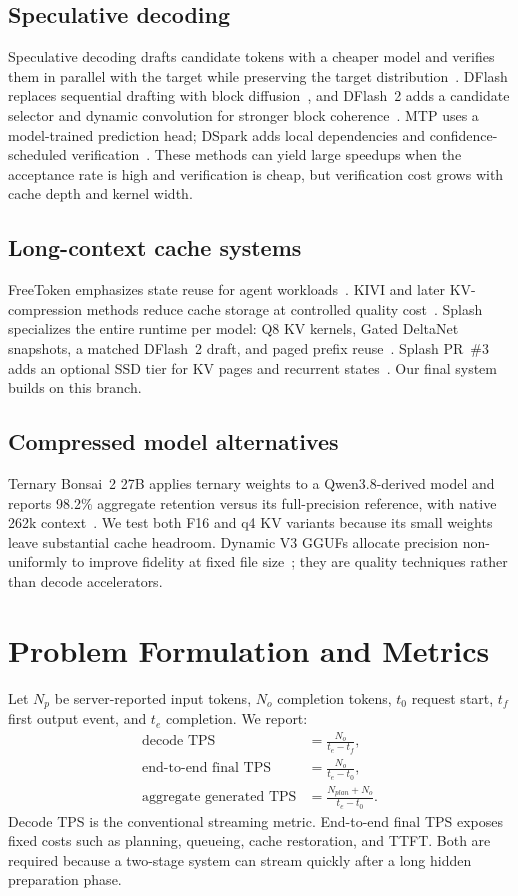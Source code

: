 \documentclass[11pt]{article}
\begin{document}
\subsection{Speculative decoding}
Speculative decoding drafts candidate tokens with a cheaper model and verifies them in parallel with the target while preserving the target distribution~\cite{leviathan,chen}. DFlash replaces sequential drafting with block diffusion~\cite{dflash}, and DFlash~2 adds a candidate selector and dynamic convolution for stronger block coherence~\cite{dflash2}. MTP uses a model-trained prediction head; DSpark adds local dependencies and confidence-scheduled verification~\cite{dspark}. These methods can yield large speedups when the acceptance rate is high and verification is cheap, but verification cost grows with cache depth and kernel width.

\subsection{Long-context cache systems}
FreeToken emphasizes state reuse for agent workloads~\cite{freetoken}. KIVI and later KV-compression methods reduce cache storage at controlled quality cost~\cite{kivi}. Splash specializes the entire runtime per model: Q8 KV kernels, Gated DeltaNet snapshots, a matched DFlash~2 draft, and paged prefix reuse~\cite{splash}. Splash PR~\#3 adds an optional SSD tier for KV pages and recurrent states~\cite{splashpr3}. Our final system builds on this branch.

\subsection{Compressed model alternatives}
Ternary Bonsai~2 27B applies ternary weights to a Qwen3.8-derived model and reports 98.2\% aggregate retention versus its full-precision reference, with native 262k context~\cite{bonsai2}. We test both F16 and q4 KV variants because its small weights leave substantial cache headroom. Dynamic V3 GGUFs allocate precision non-uniformly to improve fidelity at fixed file size~\cite{dynamicv3}; they are quality techniques rather than decode accelerators.

\section{Problem Formulation and Metrics}
Let $N_p$ be server-reported input tokens, $N_o$ completion tokens, $t_0$ request start, $t_f$ first output event, and $t_e$ completion. We report:
\begin{align}
\text{decode TPS} &= \frac{N_o}{t_e-t_f}, \\
\text{end-to-end final TPS} &= \frac{N_o}{t_e-t_0}, \\
\text{aggregate generated TPS} &= \frac{N_{plan}+N_o}{t_e-t_0}.
\end{align}
Decode TPS is the conventional streaming metric. End-to-end final TPS exposes fixed costs such as planning, queueing, cache restoration, and TTFT. Both are required because a two-stage system can stream quickly after a long hidden preparation phase.
\end{document}
